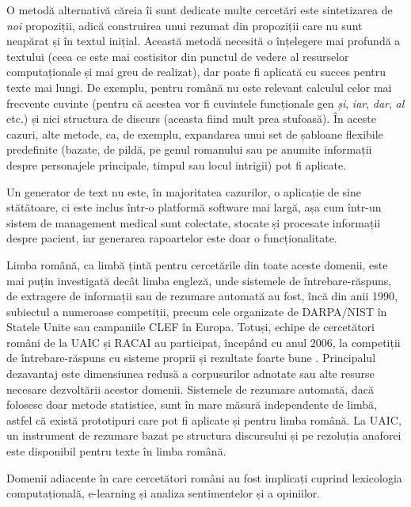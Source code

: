 \begin{multicols}{2}
O metodă alternativă căreia îi sunt dedicate multe cercetări este sintetizarea de \textit{noi} propoziții, adică construirea unui rezumat din propoziții care nu sunt neapărat și în textul inițial. Această metodă necesită o înțelegere mai profundă a textului (ceea ce este mai costisitor din punctul de vedere al resurselor computaționale și mai greu de realizat), dar poate fi aplicată cu succes pentru texte mai lungi. De exemplu, pentru română nu este relevant calculul celor mai frecvente cuvinte (pentru că acestea vor fi cuvintele funcționale gen \textit{și}, \textit{iar}, \textit{dar}, \textit{al} etc.) și nici structura de discurs (aceasta fiind mult prea stufoasă). În aceste cazuri, alte metode, ca, de exemplu, expandarea unui set de șabloane flexibile predefinite (bazate, de pildă, pe genul romanului sau pe anumite informații despre personajele principale, timpul sau locul intrigii) pot fi aplicate. 

Un generator de text nu este, în majoritatea cazurilor, o aplicație de sine stătătoare, ci este inclus într-o platformă software mai largă, așa cum într-un sistem de management medical sunt colectate, stocate și procesate informații despre pacient, iar generarea rapoartelor este doar o funcționalitate.


Limba română, ca limbă țintă pentru cercetările din toate aceste domenii, este mai puțin investigată decât limba engleză, unde sistemele de întrebare-răspuns, de extragere de informații sau de rezumare automată au fost, încă din anii 1990, subiectul a numeroase competiții, precum cele organizate de DARPA/NIST în Statele Unite sau campaniile CLEF în Europa. Totuși, echipe de cercetători români de la UAIC și RACAI au participat, începând cu anul 2006, la competiții de întrebare-răspuns cu sisteme proprii și rezultate foarte bune \cite{qa}. Principalul dezavantaj este dimensiunea redusă a corpusurilor adnotate sau alte resurse necesare dezvoltării acestor domenii. Sistemele de rezumare automată, dacă folosesc doar metode statistice, sunt în mare măsură independente de limbă, astfel că există prototipuri care pot fi aplicate și pentru limba română. La UAIC, un instrument de rezumare bazat pe structura discursului și pe rezoluția anaforei este disponibil pentru texte în limba română.

Domenii adiacente în care cercetători români au fost implicați cuprind lexicologia computațională, e-learning și analiza sentimentelor și a opiniilor. 


\end{multicols}
